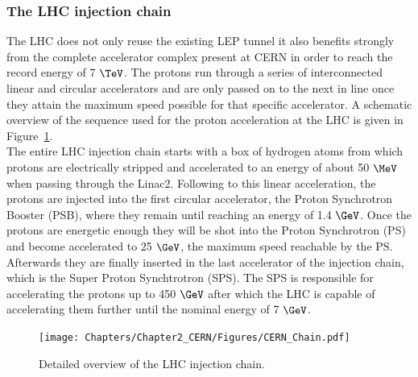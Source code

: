 \subsubsection{The LHC injection chain}
The LHC does not only reuse the existing LEP tunnel it also benefits strongly from the complete accelerator complex present at CERN in order to reach the record energy of 7 $\TeV$. 
The protons run through a series of interconnected linear and circular accelerators and are only passed on to the next in line once they attain the maximum speed possible for that specific accelerator. A schematic overview of the sequence used for the proton acceleration at the LHC is given in Figure~\ref{fig::LHCChain}.\\
The entire LHC injection chain starts with a box of hydrogen atoms from which protons are electrically stripped and accelerated to an energy of about 50 $\MeV$ when passing through the Linac2.
Following to this linear acceleration, the protons are injected into the first circular accelerator, the Proton Synchrotron Booster (PSB), where they remain until reaching an energy of 1.4 $\GeV$.
Once the protons are energetic enough they will be shot into the Proton Synchrotron (PS) and become accelerated to 25 $\GeV$, the maximum speed reachable by the PS.
Afterwards they are finally inserted in the last accelerator of the injection chain, which is the Super Proton Synchtrotron (SPS).
The SPS is responsible for accelerating the protons up to 450 $\GeV$ after which the LHC is capable of accelerating them further until the nominal energy of 7 $\GeV$.
\begin{figure}[h!t]
 \centering
 \texttt{[image: Chapters/Chapter2\_CERN/Figures/CERN\_Chain.pdf]}
 \caption{Detailed overview of the LHC injection chain.} \label{fig::LHCChain}
\end{figure}

